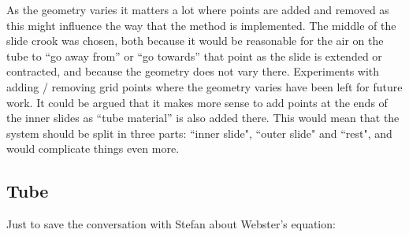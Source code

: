 As the geometry varies it matters a lot where points are added and removed as this might influence the way that the method is implemented.  The middle of the slide crook was chosen, both because it would be reasonable for the air on the tube to ``go away from'' or ``go towards'' that point as the slide is extended or contracted, and because the geometry does not vary there. Experiments with adding / removing grid points where the geometry varies have been left for future work.  It could be argued that it makes more sense to add points at the ends of the inner slides as ``tube material'' is also added there. This would mean that the system should be split in three parts: ``inner slide", ``outer slide" and ``rest", and would complicate things even more.



\subsection{Tube}
Just to save the conversation with Stefan about Webster's equation:


